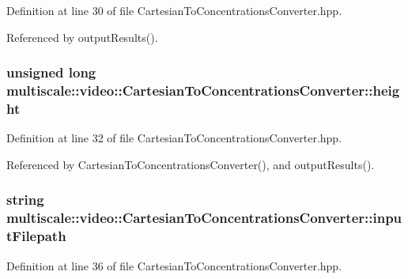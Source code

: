 Definition at line 30 of file Cartesian\-To\-Concentrations\-Converter.\-hpp.



Referenced by output\-Results().

\hypertarget{classmultiscale_1_1video_1_1CartesianToConcentrationsConverter_a94e58072f2e143bd6476133370ffb37f}{
\subsubsection[{height}]{\setlength{\rightskip}{0pt plus 5cm}unsigned long multiscale\-::video\-::\-Cartesian\-To\-Concentrations\-Converter\-::height\hspace{0.3cm}{\ttfamily [private]}}}\label{classmultiscale_1_1video_1_1CartesianToConcentrationsConverter_a94e58072f2e143bd6476133370ffb37f}


Definition at line 32 of file Cartesian\-To\-Concentrations\-Converter.\-hpp.



Referenced by Cartesian\-To\-Concentrations\-Converter(), and output\-Results().

\hypertarget{classmultiscale_1_1video_1_1CartesianToConcentrationsConverter_affebbc7e1c67692bd529f19fc0451e58}{
\subsubsection[{input\-Filepath}]{\setlength{\rightskip}{0pt plus 5cm}string multiscale\-::video\-::\-Cartesian\-To\-Concentrations\-Converter\-::input\-Filepath\hspace{0.3cm}{\ttfamily [private]}}}\label{classmultiscale_1_1video_1_1CartesianToConcentrationsConverter_affebbc7e1c67692bd529f19fc0451e58}


Definition at line 36 of file Cartesian\-To\-Concentrations\-Converter.\-hpp.



